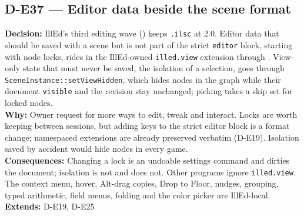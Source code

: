 \subsection*{D-E37 --- Editor data beside the scene format}
\begin{decisionbox}[title={D-E37 \quad 2026-10-01}]
\textbf{Decision:} IllEd's third editing wave
() keeps \texttt{.ilsc} at 2.0.
Editor data that should be saved with a scene but is not part of the strict
\texttt{editor} block, starting with node locks, rides in the IllEd-owned
\texttt{illed.view} extension through .
View-only state that must never be saved, the isolation of a selection, goes
through \texttt{SceneInstance::setViewHidden}, which hides nodes in the graph
while their document \texttt{visible} and the revision stay unchanged; picking
takes a skip set for locked nodes.\\
\textbf{Why:} Owner request for more ways to edit, tweak and interact. Locks
are worth keeping between sessions, but adding keys to the strict editor block
is a format change; namespaced extensions are already preserved verbatim
(D-E19). Isolation saved by accident would hide nodes in every game.\\
\textbf{Consequences:} Changing a lock is an undoable settings command and
dirties the document; isolation is not and does not. Other programs ignore
\texttt{illed.view}. The context menu, hover, Alt-drag copies, Drop to Floor,
nudges, grouping, typed arithmetic, field menus, folding and the color picker
are IllEd-local.\\
\textbf{Extends:} D-E19, D-E25
\end{decisionbox}

